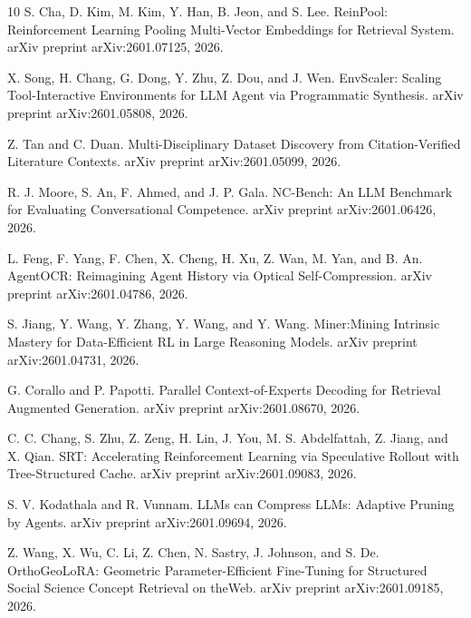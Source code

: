 \documentclass{article}
\begin{document}
\begin{thebibliography}{10}
 S. Cha, D. Kim, M. Kim, Y. Han, B. Jeon, and S. Lee. ReinPool: Reinforcement Learning Pooling Multi-Vector Embeddings for Retrieval System. arXiv preprint arXiv:2601.07125, 2026.

 X. Song, H. Chang, G. Dong, Y. Zhu, Z. Dou, and J. Wen. EnvScaler: Scaling Tool-Interactive Environments for LLM Agent via Programmatic Synthesis. arXiv preprint arXiv:2601.05808, 2026.

 Z. Tan and C. Duan. Multi-Disciplinary Dataset Discovery from Citation-Verified Literature Contexts. arXiv preprint arXiv:2601.05099, 2026.

 R. J. Moore, S. An, F. Ahmed, and J. P. Gala. NC-Bench: An LLM Benchmark for Evaluating Conversational Competence. arXiv preprint arXiv:2601.06426, 2026.

 L. Feng, F. Yang, F. Chen, X. Cheng, H. Xu, Z. Wan, M. Yan, and B. An. AgentOCR: Reimagining Agent History via Optical Self-Compression. arXiv preprint arXiv:2601.04786, 2026.

 S. Jiang, Y. Wang, Y. Zhang, Y. Wang, and Y. Wang. Miner:Mining Intrinsic Mastery for Data-Efficient RL in Large Reasoning Models. arXiv preprint arXiv:2601.04731, 2026.

 G. Corallo and P. Papotti. Parallel Context-of-Experts Decoding for Retrieval Augmented Generation. arXiv preprint arXiv:2601.08670, 2026.

 C. C. Chang, S. Zhu, Z. Zeng, H. Lin, J. You, M. S. Abdelfattah, Z. Jiang, and X. Qian. SRT: Accelerating Reinforcement Learning via Speculative Rollout with Tree-Structured Cache. arXiv preprint arXiv:2601.09083, 2026.

 S. V. Kodathala and R. Vunnam. LLMs can Compress LLMs: Adaptive Pruning by Agents. arXiv preprint arXiv:2601.09694, 2026.

 Z. Wang, X. Wu, C. Li, Z. Chen, N. Sastry, J. Johnson, and S. De. OrthoGeoLoRA: Geometric Parameter-Efficient Fine-Tuning for Structured Social Science Concept Retrieval on theWeb. arXiv preprint arXiv:2601.09185, 2026.


\end{thebibliography}
\end{document}
